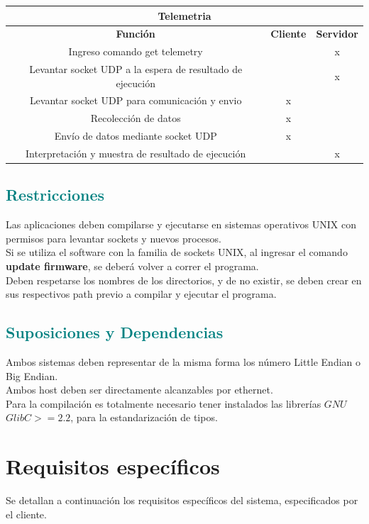 \documentclass[fontsize=12pt]{article}
\begin{document}
\begin{table}[H]
\centering
\begin{tabular}{ |c|c|c| }
 \hline
  \multicolumn{3}{|c|}{\textbf{Telemetria}}\\
  \hline 
\textbf{Función}&\textbf{Cliente} & \textbf{Servidor}\\
 \hline 
Ingreso comando get telemetry &&x\\
Levantar socket UDP a la espera de resultado de ejecución &&x\\
Levantar socket UDP para comunicación y envio &x&\\
Recolección de datos &x&\\
Envío de datos mediante socket UDP &x&\\
Interpretación y muestra de resultado de ejecución&&x\\
  \hline
\end{tabular}
\bigskip \bigskip \bigskip
\end{table}






\subsection{\textcolor{teal}{\textbf{Restricciones}}}
Las aplicaciones deben compilarse y ejecutarse en sistemas operativos UNIX con permisos para levantar sockets y nuevos procesos.\\
Si se utiliza el software con la familia de sockets UNIX, al ingresar el comando \textbf{update firmware}, se deberá volver a correr el programa.\\
Deben respetarse los nombres de los directorios, y de no existir, se deben crear en sus respectivos path previo a compilar y ejecutar el programa.\\
\subsection{\textcolor{teal}{\textbf{Suposiciones y Dependencias}}}
Ambos sistemas deben representar de la misma forma los número Little Endian o Big Endian.\\
Ambos host deben ser directamente alcanzables por ethernet.\\
Para la compilación es totalmente necesario tener instalados las librerías $GNU$ $GlibC >= 2.2$, para la estandarización de tipos.
\section{\textbf{Requisitos específicos}} \label{reqesp}
Se detallan a continuación los requisitos específicos del sistema, especificados por
el cliente.\\
\end{document}
